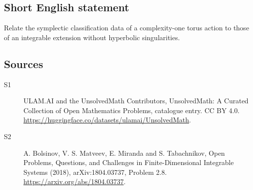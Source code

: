 \documentclass[11pt]{article}
\begin{document}
\subsection{Short English statement}
Relate the symplectic classification data of a complexity-one torus action to those of an integrable extension without hyperbolic singularities.
\subsection{Sources}
\begin{description}
\item[\hypertarget{source:statement:1}{S1}] ULAM.AI and the UnsolvedMath Contributors, UnsolvedMath: A Curated Collection of Open Mathematics Problems, catalogue entry. CC BY 4.0. \url{https://huggingface.co/datasets/ulamai/UnsolvedMath}.
\item[\hypertarget{source:statement:2}{S2}] A. Bolsinov, V. S. Matveev, E. Miranda and S. Tabachnikov, Open Problems, Questions, and Challenges in Finite-Dimensional Integrable Systems (2018), arXiv:1804.03737, Problem 2.8. \url{https://arxiv.org/abs/1804.03737}.
\end{description}
\label{end:statement}
\end{document}
